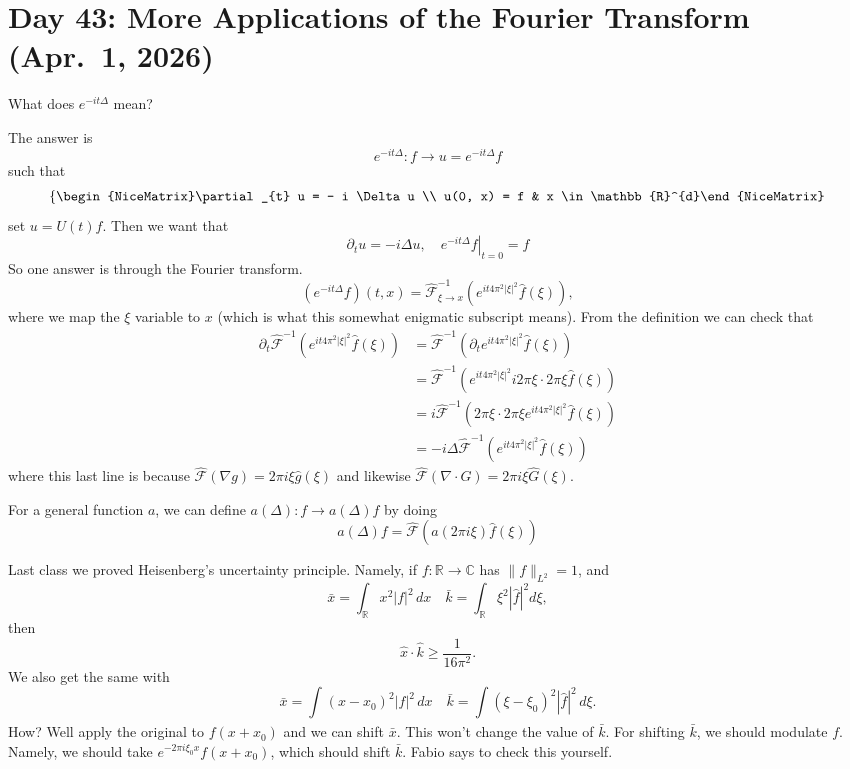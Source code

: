 \section{Day 43: More Applications of the Fourier Transform (Apr.\ 1, 2026)}
What does \( e^{- i t \Delta} \) mean?

The answer is 
\[ e^{- i t \Delta} \colon f \to u = e^{-i t \Delta} f \]
such that
\[ \left\{\begin{NiceMatrix}\partial_{t} u = - i \Delta u \\ u(0, x) = f & x \in \mathbb{R}^{d}\end{NiceMatrix}\right.  \]
set \( u = U(t) f \). Then we want that
\[ \partial_{t} u = - i \Delta u, \quad \left. e^{-i t \Delta} f \right|_{t = 0} = f \]
So one answer is through the Fourier transform.
\[ \left( e^{-i t \Delta} f \right)(t, x) = \hat {\mathcal{F}}^{-1}_{\xi \to x} \left( e^{i t 4 \pi^{2} | \xi|^{2}} \hat f( \xi) \right), \]
where we map the \( \xi \) variable to \( x \) (which is what this somewhat enigmatic subscript means). From the definition we can check that
\begin{align*}
	\partial_{t} \hat {\mathcal{F}}^{-1} \left( e^{i t 4 \pi^{2} |\xi|^{2}} \hat f(\xi) \right) &= \hat {\mathcal{F}}^{-1} \left( \partial_{t}e^{i t 4 \pi^{2} |\xi|^{2}} \hat f(\xi) \right) \\
																																															&= \hat {\mathcal{F}}^{-1}\left( e^{i t 4 \pi^{2} |\xi|^{2}} i 2 \pi \xi \cdot 2 \pi \xi \hat f(\xi) \right) \\
																																															&= i \hat {\mathcal{F}}^{-1} \left( 2 \pi \xi \cdot 2 \pi \xi e^{i t 4 \pi^{2} |\xi|^{2}}  \hat f(\xi)\right) \\
	&= -i \Delta \hat {\mathcal{F}}^{-1} \left( e^{i t 4 \pi^{2} |\xi|^{2}}\hat f(\xi) \right)
\end{align*}
where this last line is because \( \hat {\mathcal{F}}(\nabla g) = 2 \pi i \xi \hat g(\xi) \) and likewise \( \hat {\mathcal{F}}(\nabla \cdot G) = 2 \pi i \xi \hat G(\xi) \).

For a general function \( a \), we can define
\( a(\Delta) \colon f \to a(\Delta) f \)
by doing
\[ a(\Delta) f = \hat {\mathcal{F}}\left( a(2 \pi i \xi) \hat f(\xi) \right) \]

Last class we proved Heisenberg's uncertainty principle. Namely, if \( f \colon \mathbb{R} \to \mathbb{C} \) has \( \| f \|_{L^{2}} = 1 \), and
\[ \bar x = \int_{\mathbb{R}} x^{2} |f|^{2} \, dx \quad \bar k = \int_{\mathbb{R}} \xi^{2} |\hat f|^{2} d \xi, \]
then
\[ \hat x \cdot \hat k \ge \frac{1}{16 \pi^{2}}. \]
We also get the same with
\[ \bar x = \int_{} (x - x_{0})^{2} |f|^{2} \, dx \quad \bar k = \int (\xi - \xi_{0})^{2} |\hat f|^{2} \, d \xi. \]
How? Well apply the original to \( f(x + x_{0}) \) and we can shift \( \bar x \). This won't change the value of \( \bar k \). For shifting \( \bar k \), we should modulate \( f \). Namely, we should take \( e^{- 2 \pi i \xi_{0} x} f(x + x_{0}) \), which should shift \( \bar k \). Fabio says to check this yourself.


